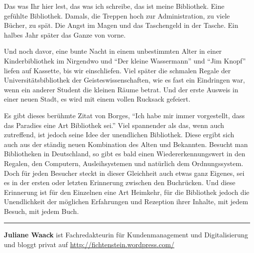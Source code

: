 \documentclass[a4paper,
fontsize=11pt,
oneside,
numbers=noperiodatend,
parskip=half-,
bibliography=totoc,
final
]{scrartcl}
\begin{document}
Das was Ihr hier lest, das was ich schreibe, das ist meine Bibliothek.
Eine gefühlte Bibliothek. Damals, die Treppen hoch zur Administration,
zu viele Bücher, zu spät. Die Angst im Magen und das Taschengeld in der
Tasche. Ein halbes Jahr später das Ganze von vorne.

Und noch davor, eine bunte Nacht in einem unbestimmten Alter in einer
Kinderbibliothek im Nirgendwo und \enquote{Der kleine Wassermann} und
\enquote{Jim Knopf} liefen auf Kassette, bis wir einschliefen. Viel
später die schmalen Regale der Universitätsbibliothek der
Geisteswissenschaften, wie es fast ein Eindringen war, wenn ein anderer
Student die kleinen Räume betrat. Und der erste Ausweis in einer neuen
Stadt, es wird mit einem vollen Rucksack gefeiert.

Es gibt dieses berühmte Zitat von Borges, \enquote{Ich habe mir immer
vorgestellt, dass das Paradies eine Art Bibliothek sei.} Viel spannender
als das, wenn auch zutreffend, ist jedoch seine Idee der unendlichen
Bibliothek. Diese ergibt sich auch aus der ständig neuen Kombination des
Alten und Bekannten. Besucht man Bibliotheken in Deutschland, so gibt es
bald einen Wiedererkennungswert in den Regalen, den Computern,
Ausleihsystemen und natürlich dem Ordnungssystem. Doch für jeden
Besucher steckt in dieser Gleichheit auch etwas ganz Eigenes, sei es in
der ersten oder letzten Erinnerung zwischen den Buchrücken. Und diese
Erinnerung ist für den Einzelnen eine Art Heimkehr, für die Bibliothek
jedoch die Unendlichkeit der möglichen Erfahrungen und Rezeption ihrer
Inhalte, mit jedem Besuch, mit jedem Buch.

\begin{center}\rule{0.5\linewidth}{\linethickness}\end{center}

\textbf{Juliane Waack} ist Fachredakteurin für Kundenmanagement und
Digitalisierung und bloggt privat auf
\url{http://fichtenstein.wordpress.com/}
\end{document}
